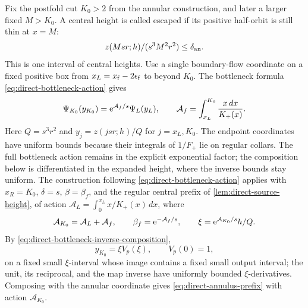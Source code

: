 Fix the postfold cut \(K_0>2\) from the annular construction,
and later a larger fixed \(M>K_0\). A central height is called
escaped if its positive half-orbit is still thin at \(x=M\):
\begin{equation}
\label{eq:direct-fold-escaped}
 z(Msr;h)/(s^3M^2r^2)\le\delta_{\rm an} .
\end{equation}
This is one interval of central heights.
Use a single boundary-flow coordinate on a fixed positive
box from \(x_L=x_{\rm f}-2\epsilon_{\rm f}\) to beyond \(K_0\).
The bottleneck formula \eqref{eq:direct-bottleneck-action}
gives
\[
 \Psi_{K_0}(y_{K_0})
    =\mathrm e^{\mathcal A_f/s}\Psi_L(y_L),\qquad
 \mathcal A_f=\int_{x_L}^{K_0}\frac{x\,dx}{K_+(x)} .
\]
Here \(Q=s^3r^2\) and \(y_j=z(jsr;h)/Q\) for
\(j=x_L,K_0\).
The endpoint coordinates have uniform bounds because their integrals
of \(1/F_+\) lie on regular collars. The full bottleneck action remains
in the explicit exponential factor; the composition below is
differentiated in the expanded height, where the inverse bounds stay
uniform.
The construction following \eqref{eq:direct-bottleneck-action} applies
with \(x_R=K_0\), \(\delta=s\), \(\beta=\beta_f\), and the regular
central prefix of \cref{lem:direct-source-height}, of action
\(\mathcal A_L=\int_0^{x_L}x/K_+(x)\,dx\), where
\[
 \mathcal A_{K_0}=\mathcal A_L+\mathcal A_f,\qquad
 \beta_f=\mathrm e^{-\mathcal A_f/s},\qquad
 \xi=\mathrm e^{\mathcal A_{K_0}/s}h/Q .
\]
By \eqref{eq:direct-bottleneck-inverse-composition},
\begin{equation}
\label{eq:direct-fold-inverse-composition}
 y_{K_0}=\xi V_p(\xi),\qquad V_p(0)=1,
\end{equation}
on a fixed small \(\xi\)-interval whose image contains a fixed small
output interval; the unit, its reciprocal, and the map inverse have
uniformly bounded \(\xi\)-derivatives.
Composing with the annular coordinate gives
\eqref{eq:direct-annulus-prefix} with action \(\mathcal A_{K_0}\).

